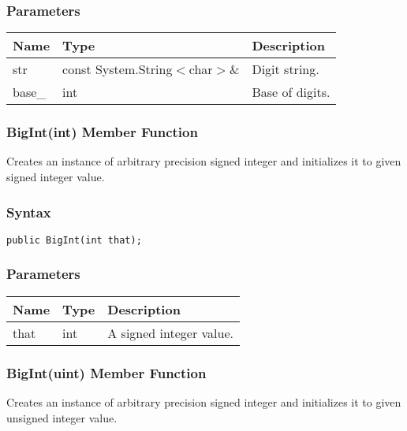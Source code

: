 \documentclass[a4paper,oneside,11.000000pt]{book}
\begin{document}
\subsubsection*{Parameters}
\begin{flushleft}
\begin{supertabular}[l]{lll}
\textbf{Name}
& \textbf{Type}
& \textbf{Description}
\\
\hline
str
& const System.\-String$<$\-char$>$\-\&\-
& Digit string.

\\
base\_
& int
& Base of digits.

\\
\end{supertabular}

\end{flushleft}
\clearpage

\hypertarget{System.Numerics.Multiprecision.BigInt.constructor.P.System.Numerics.Multiprecision.BigInt.int}{\subsubsection*{BigInt(int) Member Function}}
\begin{flushleft}
Creates an instance of arbitrary precision signed integer and initializes it to given signed integer value.

\end{flushleft}
\subsubsection*{Syntax}\texttt{public BigInt(int that);}

\subsubsection*{Parameters}
\begin{flushleft}
\begin{supertabular}[l]{lll}
\textbf{Name}
& \textbf{Type}
& \textbf{Description}
\\
\hline
that
& int
& A signed integer value.

\\
\end{supertabular}

\end{flushleft}
\clearpage

\hypertarget{System.Numerics.Multiprecision.BigInt.constructor.P.System.Numerics.Multiprecision.BigInt.uint}{\subsubsection*{BigInt(uint) Member Function}}
\begin{flushleft}
Creates an instance of arbitrary precision signed integer and initializes it to given unsigned integer value.

\end{flushleft}
\end{document}

